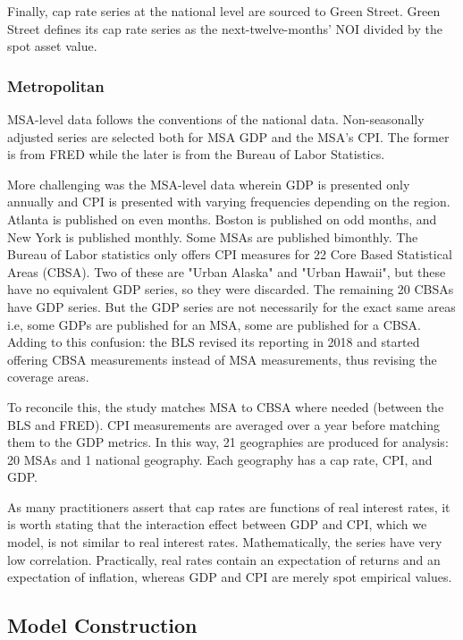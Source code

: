 \documentclass[jrfm,article,submit,oneauthor,pdftex]{Definitions/mdpi}
\begin{document}
Finally, cap rate series at the national level are sourced to Green Street. Green Street defines its cap rate series as the next-twelve-months' NOI divided by the spot asset value. 

\subsubsection{Metropolitan}

MSA-level data follows the conventions of the national data. Non-seasonally adjusted series are selected both for MSA GDP and the MSA's CPI. The former is from FRED while the later is from the Bureau of Labor Statistics.

More challenging was the MSA-level data wherein GDP is presented only annually and CPI is presented with varying frequencies depending on the region. Atlanta is published on even months. Boston is published on odd months, and New York is published monthly. Some MSAs are published bimonthly. The Bureau of Labor statistics only offers CPI measures for 22 Core Based Statistical Areas (CBSA). Two of these are "Urban Alaska" and "Urban Hawaii", but these have no equivalent GDP series, so they were discarded. The remaining 20 CBSAs have GDP series. But the GDP series are not necessarily for the exact same areas i.e, some GDPs are published for an MSA, some are published for a CBSA. Adding to this confusion: the BLS revised its reporting in 2018 and started offering CBSA measurements instead of MSA measurements, thus revising the coverage areas.

To reconcile this, the study matches MSA to CBSA where needed (between the BLS and FRED). CPI measurements are averaged over a year before matching them to the GDP metrics. In this way, 21 geographies are produced for analysis: 20 MSAs and 1 national geography. Each geography has a cap rate, CPI, and GDP. 

As many practitioners assert that cap rates are functions of real interest rates, it is worth stating that the interaction effect between GDP and CPI, which we model, is not similar to real interest rates. Mathematically, the series have very low correlation. Practically, real rates contain an expectation of returns and an expectation of inflation, whereas GDP and CPI are merely spot empirical values.


\subsection{Model Construction}
\end{document}
